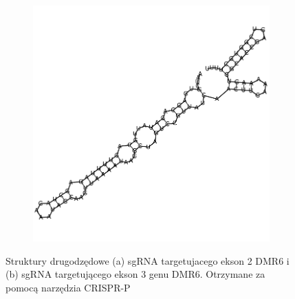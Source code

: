 \documentclass[twoside, a4paper]{article}
\begin{document}
\begin{figure}[h]
\begin{subfigure}[t]{0.45\textwidth}
		\includegraphics[width=\textwidth]{./figures/gRNA-ekson3.pdf}
		\caption{}
	\end{subfigure}
	\caption{Struktury drugodzędowe (a) sgRNA targetujacego ekson 2 DMR6 i (b) sgRNA targetującego ekson 3 genu DMR6. Otrzymane za pomocą narzędzia CRISPR-P}
\end{figure}

\nocite{Lei2014}

\printbibliography
\end{document}
